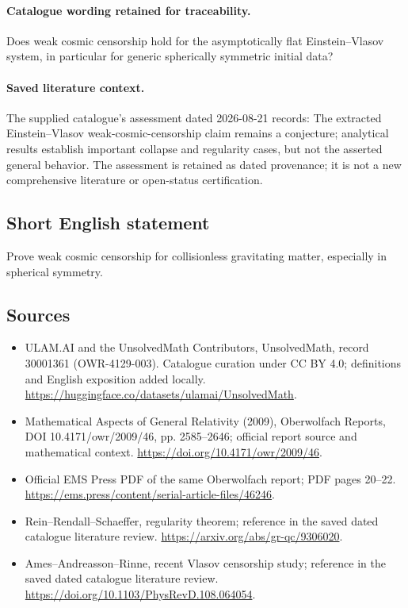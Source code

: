 \documentclass[11pt]{article}
\begin{document}
\paragraph{Catalogue wording retained for traceability.}
Does weak cosmic censorship hold for the asymptotically flat Einstein–Vlasov system, in particular for generic spherically symmetric initial data?

\paragraph{Saved literature context.} The supplied catalogue's assessment dated 2026-08-21 records: The extracted Einstein--Vlasov weak-cosmic-censorship claim remains a conjecture; analytical results establish important collapse and regularity cases, but not the asserted general behavior. The assessment is retained as dated provenance; it is not a new comprehensive literature or open-status certification.
\subsection{Short English statement}
Prove weak cosmic censorship for collisionless gravitating matter, especially in spherical symmetry.
\subsection{Sources}
\begin{itemize}
\item[\hypertarget{source:30001361:1}{S1}] ULAM.AI and the UnsolvedMath Contributors, UnsolvedMath, record 30001361 (OWR-4129-003). Catalogue curation under CC BY 4.0; definitions and English exposition added locally.
\url{https://huggingface.co/datasets/ulamai/UnsolvedMath}.
\item[\hypertarget{source:30001361:2}{S2}] Mathematical Aspects of General Relativity (2009), Oberwolfach Reports, DOI 10.4171/owr/2009/46, pp. 2585--2646; official report source and mathematical context.
\url{https://doi.org/10.4171/owr/2009/46}.
\item[\hypertarget{source:30001361:3}{S3}] Official EMS Press PDF of the same Oberwolfach report; PDF pages 20--22.
\url{https://ems.press/content/serial-article-files/46246}.
\item[\hypertarget{source:30001361:4}{S4}] Rein--Rendall--Schaeffer, regularity theorem; reference in the saved dated catalogue literature review.
\url{https://arxiv.org/abs/gr-qc/9306020}.
\item[\hypertarget{source:30001361:5}{S5}] Ames--Andreasson--Rinne, recent Vlasov censorship study; reference in the saved dated catalogue literature review.
\url{https://doi.org/10.1103/PhysRevD.108.064054}.
\end{itemize}
\label{end:30001361}
\end{document}
